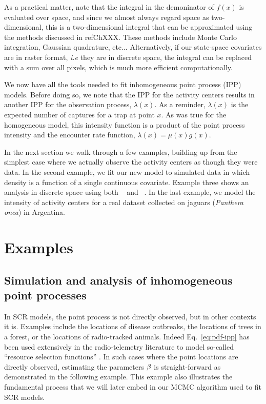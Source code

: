 As a practical matter, note that the integral in the
demoninator of $f(x)$ is evaluated over space, and since we almost always regard
space as two-dimensional, this is a two-dimensional integral that can
be approximated using the methods discussed in ref{ChXXX}. These methods include
Monte Carlo integration, Gaussian quadrature, etc... Alternatively, if
our state-space covariates are in raster format, \emph{i.e} they are
in discrete space, the integral can be replaced with a sum over
all pixels, which is much more efficient computationally.

We now have all the tools needed to fit inhomogeneous point process
(IPP) models. Before doing so, we note that the IPP for the activity centers
results in another IPP for the observation process, $\lambda(x)$. As
a reminder, $\lambda(x)$ is the expected number of captures for a trap
at point $x$. As was true for the homogeneous model, this
intensity function is a product of the point process intensity
and the encounter rate function, $\lambda(x) = \mu(x) g(x)$.

In the next section we walk through a few examples, building up from
the simplest case where we actually observe the activity centers as
though they were data. In the second example, we fit our new model to simulated
data in which density is a function of a single continuous
covariate. Example three shows an analysis in discrete space using
both \secr~\citep{efford:2011} and \jags~\citep{plummer:2003}. In the
last example, we model the intensity of
activity centers for a real dataset collected on jaguars
(\emph{Panthera onca}) in Argentina.

\section{Examples}

\subsection{Simulation and analysis of inhomogeneous point processes}

In SCR models, the point process is not directly observed, but in
other contexts it is. Examples include the locations of disease
outbreaks, the locations of trees in a forest, or the locations of
radio-tracked animals. Indeed Eq.~\ref{eq:pdf-ipp} has been used
extensively in the radio-telemetry literature to model so-called
``resource selection functions'' \citep{manly:2002,lele_keim:2006}.
In such cases where the point locations are directly observed,
estimating the parameters $\bf \beta$ is straight-forward as
demonstrated in the following example. This example also illustrates
the fundamental process that we will later embed in our MCMC algorithm
used to fit SCR models.

